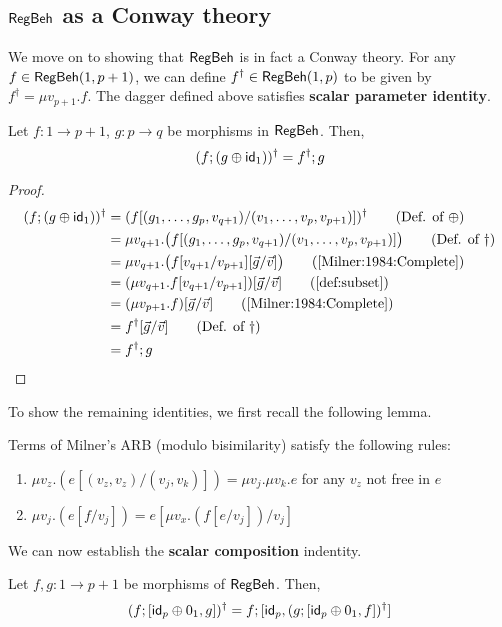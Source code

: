\subsection{$\mathsf{RegBeh}$ as a Conway theory}
We move on to showing that $\mathsf{RegBeh}$ is in fact a Conway theory. For any $f \in \mathsf{RegBeh}(1, p + 1)$, we can define $f^\dagger \in \mathsf{RegBeh}(1,p)$ to be given by $f^\dagger = \mu v_{p+1}.f$.
The dagger defined above satisfies \textbf{scalar parameter identity}.
\begin{lemma}\label{conway1}
	Let $f \colon 1 \to p + 1$, $g \colon p \to q$ be morphisms in $\mathsf{RegBeh}$. Then,
	$$
	(f ; (g\oplus \mathsf{id}_1))^\dagger = f^\dagger ; g
	$$
\end{lemma}
\begin{proof}
\begin{align*}
(f ; (g \oplus \id_1))^\dagger & = (f[(g_1, \dots, g_p, v_{q+1})/(v_1, \dots, v_{p}, v_{p+1})])^\dagger \tag{Def. of $\oplus$}\\
& = \mu v_{q+1}.\big(f[(g_1, \dots, g_p, v_{q+1})/(v_1, \dots, v_{p}, v_{p+1})]\big) \tag{Def. of $\dagger$}\\
& = \mu v_{q+1}.\big(f[v_{q+1}/v_{p+1}][\vec{g}/\vec{v}]\big) \tag{\cite[Lemma~5.6 2.]{Milner:1984:Complete}}\\
& = (\mu v_{q+1}.f[v_{q+1}/v_{p+1}])[\vec{g}/\vec{v}] \tag{\Cref{def:subset}}\\
& = (\mu v_{p+1}.f)[\vec{g}/\vec{v}] \tag{\cite[Proposition~4.6 5.]{Milner:1984:Complete}}\\
& = f^\dagger[\vec{g}/\vec{v}] \tag{Def. of $\dagger$}\\
& = f^\dagger ; g \tag*{\hfill\qedhere}
\end{align*}
\end{proof}
To show the remaining identities, we first recall the following lemma.
 \begin{lemma}
\label{lem:recursion-substitution}
Terms of Milner's ARB (modulo bisimilarity) satisfy the following rules:
	\begin{enumerate}
		\item $\mu v_z. \left(e [(v_z, v_z) / (v_j, v_k)]\right) = \mu v_j. \mu v_k. e$ for any $v_z$ not free in $e$
		\item $ \mu v_j.\left(e[f/v_j]\right) = e[\mu v_x. \left(f[e/v_j]\right)/v_j]$
	\end{enumerate}
\end{lemma}
We can now establish the \textbf{scalar composition} indentity.
\begin{lemma}\label{conway2}
Let $f,g \colon 1 \to p + 1$ be morphisms of $\mathsf{RegBeh}$. Then,
		$$
		(f ; [  \mathsf{id}_p \oplus 0_1 , g ])^\dagger = f ; [ \mathsf{id}_p, (g ;  [  \mathsf{id}_p \oplus 0_1 , f])^\dagger]
		$$ 
\end{lemma}
